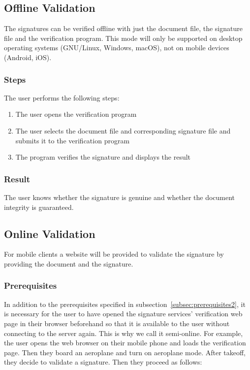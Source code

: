 \subsection{Offline Validation}\label{subsec:offline-validation2}
The signatures can be verified offline with just the document file, the signature file and the verification program.
This mode will only be supported on desktop operating systems (GNU/Linux, Windows, macOS), not on mobile devices (Android, iOS).

\subsubsection{Steps}
The user performs the following steps:
\begin{enumerate}
    \item The user opens the verification program
    \item The user selects the document file and corresponding signature file and submits it to the verification program
    \item The program verifies the signature and displays the result
\end{enumerate}
\subsubsection{Result}
The user knows whether the signature is genuine and whether the document integrity is guaranteed.

\subsection{Online Validation}\label{subsec:semi-online-validation}
For mobile clients a website will be provided to validate the signature by providing the document and the signature.

\subsubsection{Prerequisites}
In addition to the prerequisites specified in subsection~\ref{subsec:prerequisites2},
it is necessary for the user to have opened the signature services' verification web page in their browser beforehand
so that it is available to the user without connecting to the server again.
This is why we call it semi-online.
For example, the user opens the web browser on their mobile phone and loads the verification page.
Then they board an aeroplane and turn on aeroplane mode.
After takeoff, they decide to validate a signature.
Then they proceed as follows:

